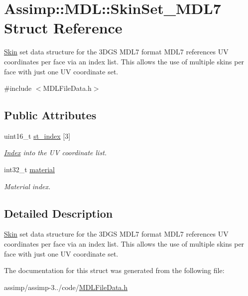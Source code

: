 \hypertarget{struct_assimp_1_1_m_d_l_1_1_skin_set___m_d_l7}{\section{Assimp\+:\+:M\+D\+L\+:\+:Skin\+Set\+\_\+\+M\+D\+L7 Struct Reference}
\label{struct_assimp_1_1_m_d_l_1_1_skin_set___m_d_l7}
}


\hyperlink{struct_assimp_1_1_m_d_l_1_1_skin}{Skin} set data structure for the 3\+D\+G\+S M\+D\+L7 format M\+D\+L7 references U\+V coordinates per face via an index list. This allows the use of multiple skins per face with just one U\+V coordinate set.  




{\ttfamily \#include $<$M\+D\+L\+File\+Data.\+h$>$}

\subsection*{Public Attributes}
\begin{DoxyCompactItemize}
\item 
\hypertarget{struct_assimp_1_1_m_d_l_1_1_skin_set___m_d_l7_a32e985aa7d562429d4f0cb0b5f584258}{uint16\+\_\+t \hyperlink{struct_assimp_1_1_m_d_l_1_1_skin_set___m_d_l7_a32e985aa7d562429d4f0cb0b5f584258}{st\+\_\+index} \mbox{[}3\mbox{]}}\label{struct_assimp_1_1_m_d_l_1_1_skin_set___m_d_l7_a32e985aa7d562429d4f0cb0b5f584258}

\begin{DoxyCompactList}\small\item\em \hyperlink{struct_index}{Index} into the U\+V coordinate list. \end{DoxyCompactList}\item 
\hypertarget{struct_assimp_1_1_m_d_l_1_1_skin_set___m_d_l7_a270f59c586b3871e5438b3964ccdca2f}{int32\+\_\+t \hyperlink{struct_assimp_1_1_m_d_l_1_1_skin_set___m_d_l7_a270f59c586b3871e5438b3964ccdca2f}{material}}\label{struct_assimp_1_1_m_d_l_1_1_skin_set___m_d_l7_a270f59c586b3871e5438b3964ccdca2f}

\begin{DoxyCompactList}\small\item\em Material index. \end{DoxyCompactList}\end{DoxyCompactItemize}


\subsection{Detailed Description}
\hyperlink{struct_assimp_1_1_m_d_l_1_1_skin}{Skin} set data structure for the 3\+D\+G\+S M\+D\+L7 format M\+D\+L7 references U\+V coordinates per face via an index list. This allows the use of multiple skins per face with just one U\+V coordinate set. 

The documentation for this struct was generated from the following file\+:\begin{DoxyCompactItemize}
\item 
assimp/assimp-\/3../code/\hyperlink{_m_d_l_file_data_8h}{M\+D\+L\+File\+Data.\+h}\end{DoxyCompactItemize}
